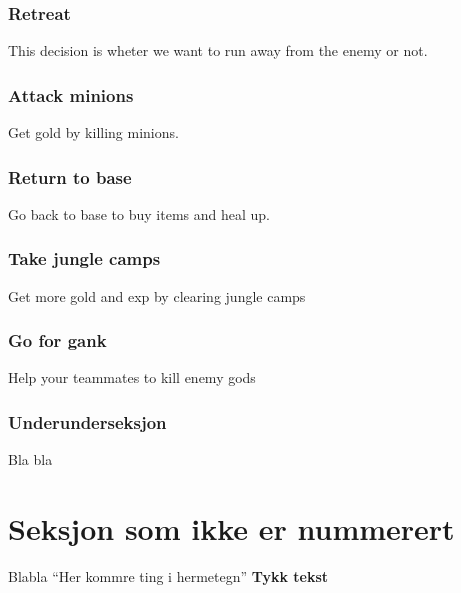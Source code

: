 \documentclass[titlepage]{article}
\begin{document}
\subsubsection*{Retreat}
This decision is wheter we want to run away from the enemy or not.
\subsubsection*{Attack minions}
Get gold by killing minions.
\subsubsection*{Return to base}
Go back to base to buy items and heal up.
\subsubsection*{Take jungle camps}
Get more gold and exp by clearing jungle camps
\subsubsection*{Go for gank}
Help your teammates to kill enemy gods

\subsubsection{Underunderseksjon}
Bla bla

\newpage

\section*{Seksjon som ikke er nummerert}
Blabla
``Her kommre ting i hermetegn'' %
\textbf{Tykk tekst}
\end{document}

